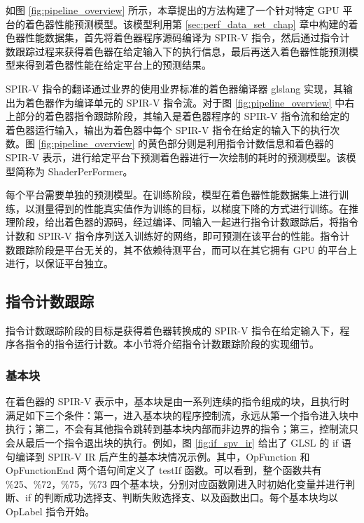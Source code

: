 如图 \ref{fig:pipeline_overview} 所示，本{\amend 章}提出的方法构建了一个针对特定 GPU 平台的着色器性能预测模型。{\amend 该模型利用第 \ref{sec:perf_data_set_chap} 章中构建的着色器性能数据集，首先将着色器程序源码编译为 SPIR-V 指令，然后通过指令计数跟踪过程来获得着色器在给定输入下的执行信息，最后再送入着色器性能预测模型来得到着色器性能在给定平台上的预测结果。}

{\amend SPIR-V 指令的翻译}通过业界的使用业界标准的着色器编译器 glslang \cite{glslang} 实现，{\amend 其输出为着色器作为编译单元的 SPIR-V 指令流。对于图 \ref{fig:pipeline_overview} 中右上部分的着色器指令跟踪阶段，其输入是着色器程序的 SPIR-V 指令流和给定的着色器运行输入，输出为着色器中每个 SPIR-V 指令在给定的输入下的执行次数。图 \ref{fig:pipeline_overview} 的黄色部分则是利用指令计数信息和着色器的 SPIR-V 表示，进行给定平台下预测着色器进行一次绘制的耗时的预测模型。该模型简称为 ShaderPerFormer。}

{\amend 每个平台需要单独的预测模型。在训练阶段，模型在着色器性能数据集上进行训练，以测量得到的性能真实值作为训练的目标，以梯度下降的方式进行训练。在推理阶段，给出着色器的源码，经过编译、同输入一起进行指令计数跟踪后，将指令计数和 SPIR-V 指令序列送入训练好的网络，即可预测在该平台的性能。指令计数跟踪阶段是平台无关的，其不依赖待测平台，而可以在其它拥有 GPU 的平台上进行，以保证平台独立。}

\subsection{指令计数跟踪}

{\amend 指令计数跟踪阶段的目标是获得着色器转换成的 SPIR-V 指令在给定输入下，程序各指令的指令运行计数。本小节将介绍指令计数跟踪阶段的实现细节。}

\subsubsection{基本块}
\label{sec:spv_bb}

在着色器的 SPIR-V 表示中，基本块是由一系列连续的指令组成的块，且执行时满足如下三个条件：{\amend 第一，}进入基本块的程序控制流，永远从第一个指令进入块中执行；{\amend 第二，}不会有其他指令跳转到基本块内部而非边界的指令；{\amend 第三，}控制流只会从最后一个指令退出块的执行。例如，图 \ref{fig:if_spv_ir} 给出了 GLSL 的 if 语句编译到 SPIR-V IR 后产生的基本块情况示例。其中，OpFunction 和 OpFunctionEnd 两个语句间定义了 testIf 函数。可以看到，整个函数共有 \%25、\%72，\%75，\%73 四个基本块，分别对应函数刚进入时初始化变量并进行判断、if 的判断成功选择支、判断失败选择支、以及函数出口。每个基本块均以 OpLabel 指令开始。

